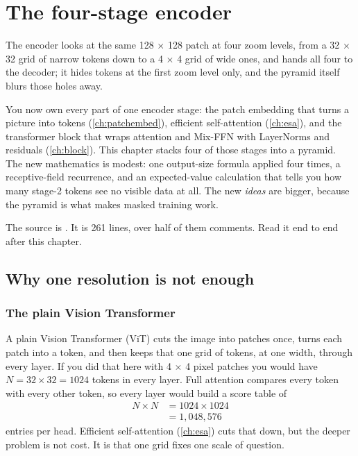 \chapter{The four-stage encoder}\label{ch:encoder}

\begin{onething}
The encoder looks at the same 128 $\times$ 128 patch at four zoom levels, from a 32 $\times$ 32 grid of
narrow tokens down to a 4 $\times$ 4 grid of wide ones, and hands all four to the decoder; it hides
tokens at the first zoom level only, and the pyramid itself blurs those holes away.
\end{onething}

You now own every part of one encoder stage: the patch embedding that turns a picture into tokens
(\cref{ch:patchembed}), efficient self-attention (\cref{ch:esa}), and the transformer block that wraps
attention and Mix-FFN with LayerNorms and residuals (\cref{ch:block}). This chapter stacks four of those
stages into a pyramid. The new mathematics is modest: one output-size formula applied four times, a
receptive-field recurrence, and an expected-value calculation that tells you how many stage-2 tokens
see no visible data at all. The new \emph{ideas} are bigger, because the pyramid is what makes masked
training work.

The source is . It is 261 lines\tagC,
over half of them comments. Read it end to end after this chapter.

\section{Why one resolution is not enough}\label{sec:encoder:why}

\subsection{The plain Vision Transformer}

A plain Vision Transformer (ViT) \citep{dosovitskiy2021image} cuts the image into patches once, turns
each patch into a token, and then keeps that one grid of tokens, at one width, through every layer. If
you did that here with 4 $\times$ 4 pixel patches you would have $N = 32 \times 32 = 1024$ tokens in
every layer. Full attention compares every token with every other token, so every layer would build a
score table of
\begin{align*}
N \times N &= 1024 \times 1024 \\
           &= 1{,}048{,}576
\end{align*}
entries per head. Efficient self-attention (\cref{ch:esa}) cuts that down, but the deeper problem is
not cost. It is that one grid fixes one scale of question.

